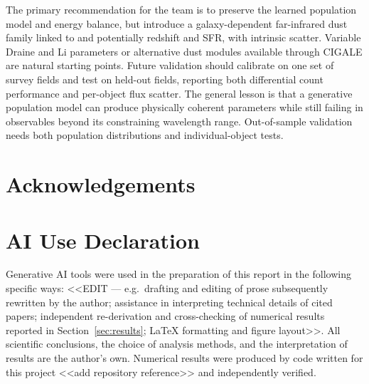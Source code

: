 \documentclass[12pt,a4paper]{article}
\begin{document}
The primary recommendation for the \popcosmos{} team is to preserve the learned
population model and energy balance, but introduce a galaxy-dependent far-infrared dust
family linked to \LIR{} and potentially redshift and SFR, with intrinsic scatter.
Variable Draine and Li parameters \citep{Draine_2007} or alternative dust modules
available through CIGALE are natural starting points. Future validation should calibrate
on one set of survey fields and test on held-out fields, reporting both differential
count performance and per-object flux scatter. The general lesson is that a generative
population model can produce physically coherent parameters while still failing in
observables beyond its constraining wavelength range. Out-of-sample validation needs
both population distributions and individual-object tests.

\section*{Acknowledgements}

\FloatBarrier
\section*{AI Use Declaration}
Generative AI tools were used in the preparation of this report in the following
specific ways: <<EDIT --- e.g.\ drafting and editing of prose subsequently rewritten by
the author; assistance in interpreting technical details of cited papers; independent
re-derivation and cross-checking of numerical results reported in
Section~\ref{sec:results}; LaTeX formatting and figure layout>>. All scientific
conclusions, the choice of analysis methods, and the interpretation of results are the
author's own. Numerical results were produced by code written for this project
<<add repository reference>> and independently verified.



\end{document}

